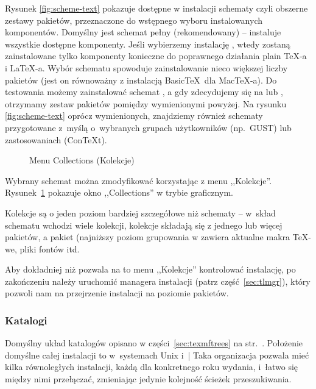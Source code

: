 \documentclass{article}
\begin{document}
Rysunek \ref{fig:scheme-text} pokazuje dostępne w instalacji   schematy czyli obszerne zestawy pakietów, przeznaczone do wstępnego wyboru instalowanych
komponentów. Domyślny jest schemat pełny  (rekomendowany) -- instaluje wszystkie dostępne komponenty. Jeśli wybierzemy   instalację , wtedy zostaną zainstalowane tylko komponenty konieczne do poprawnego działania plain \TeX-a i \LaTeX-a. Wybór schematu  spowoduje zainstalowanie nieco większej liczby pakietów (jest on równoważny z instalacją Basic\TeX\ dla Mac\TeX-a). Do testowania  możemy zainstalować schemat , a gdy zdecydujemy się na  lub , otrzymamy zestaw pakietów pomiędzy wymienionymi powyżej.
Na rysunku \ref{fig:scheme-text} oprócz wymienionych, znajdziemy również schematy przygotowane z~myślą o~wybranych grupach użytkowników (np.~GUST) lub zastosowaniach (ConTeXt).



\begin{figure}[tb]
\begin{center}
\centering {}
\caption{Menu Collections (Kolekcje)}\label{fig:collections-gui}
\end{center}
\end{figure}

Wybrany schemat można zmodyfikować korzystając z menu ,,Kolekcje''.
Rysunek~\ref{fig:collections-gui}  pokazuje okno ,,Collections'' w trybie graficznym.

Kolekcje są o jeden poziom bardziej szczegółowe niż schematy -- w~skład schematu wchodzi
wiele kolekcji, kolekcje składają się z jednego lub więcej  pakietów, a pakiet
(najniższy poziom grupowania w \TL{} zawiera aktualne makra \TeX-we, pliki fontów itd.

Aby  dokładniej niż pozwala na to menu ,,Kolekcje'' kontrolować  instalację,
po zakończeniu należy uruchomić managera instalacji 
(patrz część~\ref{sec:tlmgr}), który pozwoli nam na przejrzenie instalacji
na poziomie pakietów.

\subsubsection{Katalogi}
\label{sec:directories}

Domyślny układ katalogów opisano w części~\ref{sec:texmftrees} na
str.~\pageref{sec:texmftrees}. Położenie domyślne całej instalacji to
 w~systemach Unix i~|%
Taka organizacja pozwala mieć  kilka równoległych instalacji, każdą dla konkretnego
roku wydania, i~łatwo się  między nimi przełączać, zmieniając jedynie
kolejność ścieżek przeszukiwania.
\end{document}
